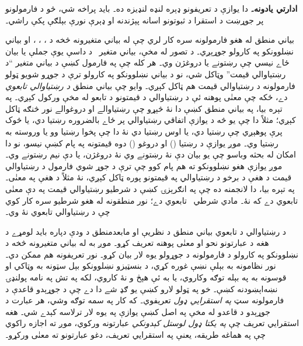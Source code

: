\documentclass[12pt,a4paper,oneside]{report}
\newcommand{\olfileid}[3]{\gdef\pspart{#1}\gdef\pschapter{#2}\gdef\pssection{#3}}
\gdef\pspart{#2}\gdef\pschapter{#3}\gdef\pssection{}%
\theoremstyle{definition}
\newenvironment{editorial}{\begin{framed}\textbf{ادارتي يادونه۔}\enspace}{\end{framed}}
\begin{document}
\label{olpseg:OLP-0056-B005:start}
\begin{editorial}
  دا يوازې د تعريفونو ډېره لنډه لنډيزه ده۔ بايد پراخه شي، څو د
  فارمولونو پر جوړښت د استقرا د ثبوتونو اسانه پېژندنه او ډېرې نورې
  بېلګې پکې راشي۔
\end{editorial}
\label{olpseg:OLP-0056-B005:end}

\label{olpseg:OLP-0057-B004:start}
\olfileid{pl}{syn}{int}
\label{olpseg:OLP-0057-B004:end}

\label{olpseg:OLP-0057-B005:start}
\label{olpseg:OLP-0057-B005:end}

\label{olpseg:OLP-0057-B006:start}
بياني منطق له هغو فارمولونه سره کار لري چې له
بياني متغيرونه څخه د \LR{$\lnot$}، \LR{$\land$}، \LR{$\lor$}، \LR{$\lif$} او
\LR{$\liff$} بياني نښلوونکو په کارولو جوړېږي۔ د تصور له مخې،
بياني متغير~ د داسې يوې جملې يا بيان ځاے نيسي
چې رښتونے يا دروغژن وي۔ هر کله چې په فارمول کښې د
بياني متغير ``د رښتياوالي قيمت'' وټاکل شي، نو د
بياني نښلوونکو په کارولو ترې د جوړو شويو ټولو فارمولونه د
رښتياوالي قيمت هم ټاکل کېږي۔ وايو چې بياني منطق \emph{د رښتياوالي
  تابعوي} دے، ځکه چې معنٰی پوهنه ئې د رښتياوالي د قيمتونو د تابعو
له مخې ورکول کېږي۔ په تېره بيا، په بياني منطق کښې دا نۀ څېړو چې
رښتياوالے او دروغوالے نور څنګه ټاکل کېږي؛ مثلاً دا چې يو څه د يوازې
اتفاقي رښتياوالي پر ځاے بالضروره رښتيا دي، يا څوک پرې پوهېږي چې
رښتيا دي، يا اوس رښتيا دي نۀ دا چې پخوا رښتيا وو يا وروسته به رښتيا
وي۔ موږ يوازې د رښتيا (\LR{$\True$}) او دروغو (\LR{$\False$}) دوه قيمتونه په
پام کښې نيسو، نو دا امکان له بحثه وباسو چې يو بيان دې نۀ رښتونے وي
نۀ دروغژن، يا دې نيم رښتونے وي۔ موږ يوازې هغو نښلوونکو ته هم پام
کوو چې ترې د جوړ شوي فارمول د رښتياوالي قيمت د هغې د برخو د
رښتياوالي په قيمتونو پوره ټاکل کېږي، نۀ مثلاً د هغې په معنٰی۔ په
تېره بيا، دا لانجمنه ده چې په انګرېزۍ کښې د شرطيو رښتياوالي قيمت په
دې معنٰی تابعوي دے که نۀ۔ مادي شرطي~\LR{$\lif$} تابعوي دے؛ نور منطقونه
له هغو شرطيو سره کار کوي چې د رښتياوالي تابعوي نۀ وي۔
\label{olpseg:OLP-0057-B006:end}

\label{olpseg:OLP-0057-B007:start}
د رښتياوالي د تابعوي بياني منطق د نظريې او مابعدمنطق د ودې دپاره
بايد لومړے د هغه د عبارتونو نحو او معنٰی پوهنه تعريف کړو۔ موږ به له
بياني متغيرونه څخه د نښلوونکو په کارولو د فارمولونه
د جوړولو يوه لار بيان کړو۔ نور تعريفونه هم ممکن دي۔ نور نظامونه به
بېلې نښې غوره کړي، د بنسټيزو نښلوونکو بېل سټونه به وټاکي او قوسونه
به په بېله توګه وکاروي، يا به ئې هېڅ و نۀ کاروي، لکه په تش په نامه
پولنډۍ نښه‌اېښودنه کښې۔ خو په ټولو لارو کښې يو ګډ شے دا دے چې د
جوړېدو قاعدې د فارمولونه سټ \emph{په استقرايي ډول} تعريفوي۔ که
کار په سمه توګه وشي، هر عبارت د جوړېدو د قاعدو له مخې په اصل کښې
يوازې په يوه لار ترلاسه کېدے شي۔ هغه استقرايي تعريف چې
\emph{په يکتا ډول لوستل کېدونکي} عبارتونه ورکوي، موږ ته اجازه راکوي
چې په هماغه طريقه، يعنې په استقرايي تعريف، دغو عبارتونو ته معنٰی
ورکړو۔
\label{olpseg:OLP-0057-B007:end}
\end{document}
